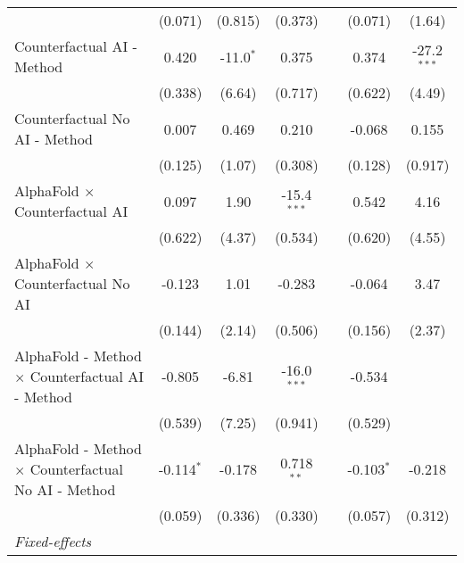 \begin{tabular}{lcccccc}
                                                              & (0.071)       & (0.815)      & (0.373)       &              & (0.071)        & (1.64)\\   
   Counterfactual AI - Method                                 & 0.420         & -11.0$^{*}$  & 0.375         &              & 0.374          & -27.2$^{***}$\\   
                                                              & (0.338)       & (6.64)       & (0.717)       &              & (0.622)        & (4.49)\\   
   Counterfactual No AI - Method                              & 0.007         & 0.469        & 0.210         &              & -0.068         & 0.155\\   
                                                              & (0.125)       & (1.07)       & (0.308)       &              & (0.128)        & (0.917)\\   
   AlphaFold $\times$ Counterfactual AI                       & 0.097         & 1.90         & -15.4$^{***}$ &              & 0.542          & 4.16\\   
                                                              & (0.622)       & (4.37)       & (0.534)       &              & (0.620)        & (4.55)\\   
   AlphaFold $\times$ Counterfactual No AI                    & -0.123        & 1.01         & -0.283        &              & -0.064         & 3.47\\   
                                                              & (0.144)       & (2.14)       & (0.506)       &              & (0.156)        & (2.37)\\   
   AlphaFold - Method $\times$ Counterfactual AI - Method     & -0.805        & -6.81        & -16.0$^{***}$ &              & -0.534         &   \\   
                                                              & (0.539)       & (7.25)       & (0.941)       &              & (0.529)        &   \\   
   AlphaFold - Method $\times$ Counterfactual No AI - Method  & -0.114$^{*}$  & -0.178       & 0.718$^{**}$  &              & -0.103$^{*}$   & -0.218\\   
                                                              & (0.059)       & (0.336)      & (0.330)       &              & (0.057)        & (0.312)\\   
   \midrule
   \emph{Fixed-effects}\\

\end{tabular}
